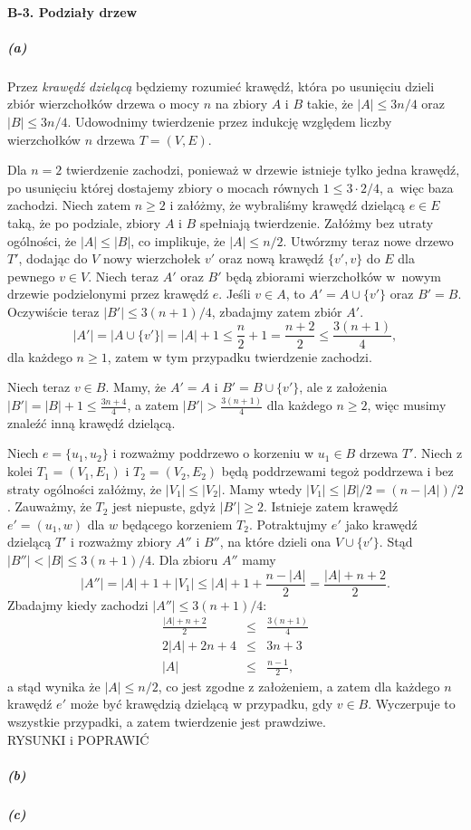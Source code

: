 \paragraph{B-3. Podziały drzew}

\subparagraph{(a)}
Przez \emph{krawędź dzielącą} będziemy rozumieć krawędź, która po usunięciu dzieli zbiór wierzchołków drzewa o mocy $n$ na zbiory $A$ i $B$ takie, że $|A|\le 3n/4$ oraz $|B|\le 3n/4$. Udowodnimy twierdzenie przez indukcję względem liczby wierzchołków $n$ drzewa $T=(V,E)$.

Dla $n=2$ twierdzenie zachodzi, ponieważ w drzewie istnieje tylko jedna krawędź, po usunięciu której dostajemy zbiory o mocach równych $1\le 3\cdot 2/4$, a~więc baza zachodzi. Niech zatem $n\ge 2$ i załóżmy, że wybraliśmy krawędź dzielącą $e\in E$ taką, że po podziale, zbiory $A$ i $B$ spełniają twierdzenie. Załóżmy bez utraty ogólności, że $|A|\le |B|$, co implikuje, że $|A|\le n/2$. Utwórzmy teraz nowe drzewo $T'$, dodając do $V$ nowy wierzchołek $v'$ oraz nową krawędź $\{v',v\}$ do $E$ dla pewnego $v\in V$. Niech teraz $A'$ oraz $B'$ będą zbiorami wierzchołków w~nowym drzewie podzielonymi przez krawędź $e$. Jeśli $v\in A$, to $A'=A\cup \{v'\}$ oraz $B'=B$. Oczywiście teraz $|B'|\le 3(n+1)/4$, zbadajmy zatem zbiór $A'$.
\[
	|A'| = |A\cup \{v'\}| = |A|+1\le\frac{n}{2}+1 = \frac{n+2}{2}\le\frac{3(n+1)}{4},
\]
dla każdego $n\ge 1$, zatem w tym przypadku twierdzenie zachodzi.

Niech teraz $v\in B$. Mamy, że $A'=A$ i $B'=B\cup \{v'\}$, ale z założenia $|B'|=|B|+1\le\frac{3n+4}{4}$, a zatem $|B'|>\frac{3(n+1)}{4}$ dla każdego $n\ge 2$, więc musimy znaleźć inną krawędź dzielącą.

Niech $e=\{u_1,u_2\}$ i rozważmy poddrzewo o korzeniu w $u_1\in B$ drzewa $T'$. Niech z kolei $T_1=(V_1,E_1)$ i $T_2=(V_2,E_2)$ będą poddrzewami tegoż poddrzewa i bez straty ogólności załóżmy, że $|V_1|\le |V_2|$. Mamy wtedy $|V_1|\le |B|/2=(n-|A|)/2$. Zauważmy, że $T_2$ jest niepuste, gdyż $|B'|\ge 2$. Istnieje zatem krawędź $e'=(u_1,w)$ dla $w$ będącego korzeniem $T_2$. Potraktujmy $e'$ jako krawędź dzielącą $T'$ i rozważmy zbiory $A''$ i $B''$, na które dzieli ona $V\cup \{v'\}$. Stąd $|B''|<|B|\le 3(n+1)/4$. Dla zbioru $A''$ mamy
\[
	|A''| = |A|+1+|V_1|\le |A|+1+\frac{n-|A|}{2} = \frac{|A|+n+2}{2}.
\]
Zbadajmy kiedy zachodzi $|A''|\le 3(n+1)/4$:
\begin{eqnarray*}
	\frac{|A|+n+2}{2} &\le& \frac{3(n+1)}{4} \\
	2|A|+2n+4 &\le& 3n+3 \\
	|A| &\le& \frac{n-1}{2},
\end{eqnarray*}
a stąd wynika że $|A|\le n/2$, co jest zgodne z założeniem, a zatem dla każdego $n$ krawędź $e'$ może być krawędzią dzielącą w przypadku, gdy $v\in B$. Wyczerpuje to wszystkie przypadki, a zatem twierdzenie jest prawdziwe.\\
RYSUNKI i POPRAWIĆ

\subparagraph{(b)}
\subparagraph{(c)}
